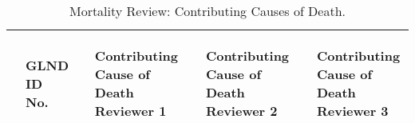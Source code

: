 \documentclass[dvips, 10pt]{article}
\begin{document}
\begin{table}[t]
\caption
{ Mortality Review: Contributing Causes of Death. }
\begin{center}
\begin{tabular}{ @{}l@{}
@{}l@{}@{}p{1.5em}@{}@{}p{1.75in}@{}@{}p{1.5em}@{}@{}p{1.75in}@{}@{}p{1.5em}@{}@{}p{1.75in}@{}
}
\hline

& \parbox{6em}{\begin{center}GLND ID No.\end{center}} && \parbox{6em}{\begin{center}Contributing Cause of Death Reviewer 1\end{center}} && \parbox{6em}{\begin{center}Contributing Cause of Death Reviewer 2\end{center}} && \parbox{6em}{\begin{center}Contributing Cause of Death Reviewer 3\end{center}} \\

\hline


\end{tabular}
\end{center}
\end{table}
\end{document}
